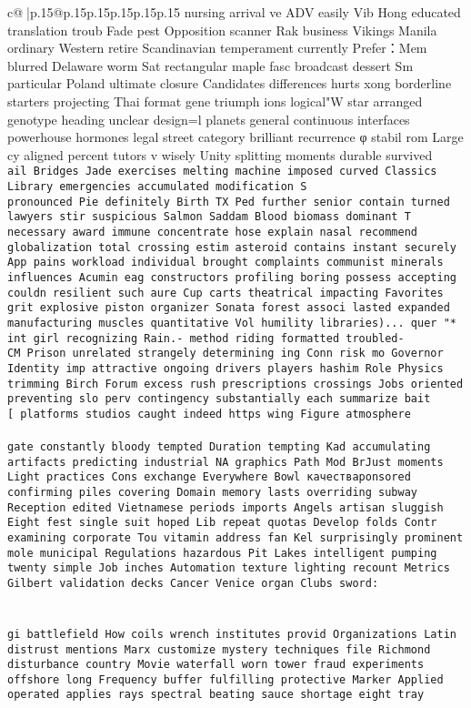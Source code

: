 \documentclass{article}
\begin{document}
{\begin{supertabular}{c@{$\;$}|p{.15\linewidth}@{}p{.15\linewidth}p{.15\linewidth}p{.15\linewidth}p{.15\linewidth}p{.15\linewidth}}
{{{nursing arrival ve ADV easily Vib Hong educated translation troub Fade pest Opposition scanner Rak business Vikings Manila ordinary Western retire Scandinavian temperament currently Prefer：Mem blurred Delaware worm Sat rectangular maple fasc broadcast dessert Sm particular Poland ultimate closure Candidates differences hurts xong borderline starters projecting Thai format gene triumph ions logical"W star arranged genotype heading unclear design=l planets general continuous interfaces powerhouse hormones legal street category brilliant recurrence φ stabil rom Large cy aligned percent tutors	v wisely Unity splitting moments durable survived \\ \tt ail Bridges Jade exercises melting machine imposed curved Classics Library emergencies accumulated modification S  \\ \tt  pronounced Pie definitely Birth TX Ped further senior contain turned lawyers stir suspicious Salmon Saddam Blood biomass dominant T necessary award immune concentrate hose explain nasal recommend globalization total crossing estim asteroid contains instant securely App pains workload individual brought complaints communist minerals influences Acumin eag constructors profiling boring possess accepting couldn resilient such aure Cup carts theatrical impacting Favorites grit explosive piston organizer Sonata forest associ lasted expanded manufacturing muscles quantitative Vol humility libraries)... quer "* int girl recognizing Rain.- method riding formatted troubled-\\ \tt  CM Prison unrelated strangely determining ing Conn risk mo Governor Identity imp attractive ongoing drivers players hashim Role Physics trimming Birch Forum excess rush prescriptions crossings Jobs oriented preventing slo perv contingency substantially each summarize bait [\ platforms studios caught indeed https wing Figure atmosphere \\ \tt     \\ \tt  gate constantly bloody tempted Duration tempting Kad accumulating artifacts predicting industrial NA graphics Path Mod BrJust moments Light practices Cons exchange Everywhere Bowl качестваponsored confirming piles covering Domain memory lasts overriding subway Reception edited Vietnamese periods imports Angels artisan sluggish Eight fest single suit hoped Lib repeat quotas Develop folds Contr examining corporate Tou vitamin address fan Kel surprisingly prominent mole municipal Regulations hazardous Pit Lakes intelligent pumping twenty simple Job inches Automation texture lighting recount Metrics Gilbert validation decks Cancer Venice organ Clubs sword:\\ \tt \\ \tt \\ \tt  gi battlefield How coils wrench institutes provid Organizations Latin distrust mentions Marx customize mystery techniques file Richmond disturbance country Movie waterfall worn tower fraud experiments offshore long Frequency buffer fulfilling protective Marker Applied operated applies rays spectral beating sauce shortage eight tray }}}
\end{supertabular}}
\end{document}

